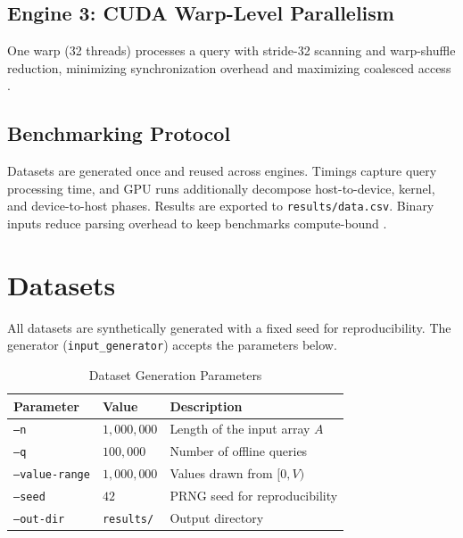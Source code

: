 \documentclass[12pt,a4paper]{article}
\begin{document}
	\subsection{Engine 3: CUDA Warp-Level Parallelism}
	One warp (32 threads) processes a query with stride-32 scanning and warp-shuffle reduction, minimizing synchronization overhead and maximizing coalesced access \cite{nvidia2024cuda,harris2007parallel,merrill2016warpreduce}.
	
	\subsection{Benchmarking Protocol}
	Datasets are generated once and reused across engines. Timings capture query processing time, and GPU runs additionally decompose host-to-device, kernel, and device-to-host phases. Results are exported to \texttt{results/data.csv}. Binary inputs reduce parsing overhead to keep benchmarks compute-bound \cite{lemire2019parsing}.
    
   \newpage
   \section{Datasets}
   All datasets are synthetically generated with a fixed seed for reproducibility. The generator (\texttt{input\_generator}) accepts the parameters below.
   
   \begin{table}[h!]
   \centering
   \caption{Dataset Generation Parameters}
   \label{tab:dataset-params}
   \begin{tabular}{|p{3cm}|p{3cm}|p{7cm}|}
   \hline
   \textbf{Parameter} & \textbf{Value} & \textbf{Description} \\
   \hline
   \texttt{--n} & $1{,}000{,}000$ & Length of the input array $A$ \\
   \texttt{--q} & $100{,}000$ & Number of offline queries \\
   \texttt{--value-range} & $1{,}000{,}000$ & Values drawn from $[0, V)$ \\
   \texttt{--seed} & $42$ & PRNG seed for reproducibility \\
   \texttt{--out-dir} & \texttt{results/} & Output directory \\
   \hline
   \end{tabular}
   \end{table}
   
\end{document}
